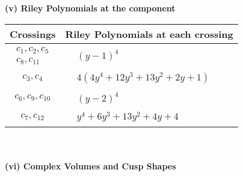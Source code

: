 \documentclass[1p]{elsarticle_modified}
\theoremstyle{definition}
\begin{document}
\newpage\renewcommand{\arraystretch}{1}
\flushleft \textbf{(v) Riley Polynomials at the component}\newline \\
\begin{tabular}{m{50pt}|m{274pt}}
Crossings & \hspace{64pt}Riley Polynomials at each crossing \\
\hline $$\begin{aligned}c_{1},c_{2},c_{5}\\c_{8},c_{11}\end{aligned}$$&$\begin{aligned}
&(y-1)^4
\end{aligned}$\\
\hline $$\begin{aligned}c_{3},c_{4}\end{aligned}$$&$\begin{aligned}
&4(4 y^4+12 y^3+13 y^2+2 y+1)
\end{aligned}$\\
\hline $$\begin{aligned}c_{6},c_{9},c_{10}\end{aligned}$$&$\begin{aligned}
&(y-2)^4
\end{aligned}$\\
\hline $$\begin{aligned}c_{7},c_{12}\end{aligned}$$&$\begin{aligned}
&y^4+6 y^3+13 y^2+4 y+4
\end{aligned}$\\
\hline
\end{tabular}\\~\\
\newpage\flushleft \textbf{(vi) Complex Volumes and Cusp Shapes}
\end{document}
